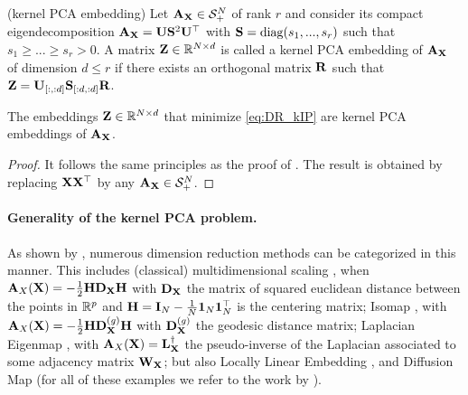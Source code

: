 \begin{definition}{(kernel PCA embedding)}
	Let ${\mathbf{A}}_{{\mathbf{X}}} \in \mathcal{S}^N_{+}$ of rank $r$ and consider its compact eigendecomposition ${\mathbf{A}}_{{\mathbf{X}}} = {\mathbf{U}} {\mathbf{S}}^2 {\mathbf{U}}^\top$ with ${\mathbf{S}} = \operatorname{diag}(s_1, ..., s_r)$ such that $s_1 \geq ... \geq s_r > 0$. A matrix
	${\mathbf{Z}} \in \mathbb{R}^{N \times d}$ is called a kernel PCA embedding of ${\mathbf{A}}_{{\mathbf{X}}}$ of dimension $d \leq r$ if there exists an orthogonal matrix ${\mathbf{R}}$ such that ${\mathbf{Z}} = {\mathbf{U}}_{[:,:d]} {\mathbf{S}}_{[:d,:d]} {\mathbf{R}}$.
\end{definition}

\begin{proposition}
	The embeddings ${\mathbf{Z}} \in \mathbb{R}^{N \times d}$ that minimize \ref{eq:DR_kIP} are kernel PCA embeddings of ${\mathbf{A}}_{{\mathbf{X}}}$.
\end{proposition}

\begin{proof}
	It follows the same principles as the proof of . The result is obtained by replacing ${\mathbf{X}} {\mathbf{X}}^\top$ by any ${\mathbf{A}}_{{\mathbf{X}}} \in \mathcal{S}^N_{+}$.
\end{proof}

\paragraph{Generality of the kernel PCA problem.}
As shown by \citet{ham2004kernel, ghojogh2021unified}, numerous dimension reduction methods can be categorized in this manner.
This includes 
(classical) multidimensional scaling \citep{borg2005modern}, when ${\mathbf{A}}_{X}({\mathbf{X}}) = -\frac{1}{2} {\mathbf{H}} {\mathbf{D}}_{\mathbf{X}} {\mathbf{H}}$ with ${\mathbf{D}}_{\mathbf{X}}$ the matrix of squared euclidean distance between the points in $\mathbb{R}^{p}$ and ${\mathbf{H}} = {\mathbf{I}}_N - \frac{1}{N} \bm{1}_N \bm{1}_N^\top$ is the centering matrix; Isomap \citep{tenenbaum2000global}, with ${\mathbf{A}}_{X}({\mathbf{X}}) = -\frac{1}{2} {\mathbf{H}} {\mathbf{D}}_{\mathbf{X}}^{(g)} {\mathbf{H}}$ with ${\mathbf{D}}_{\mathbf{X}}^{(g)}$ the geodesic distance matrix; Laplacian Eigenmap
\citep{belkin2003laplacian}, with ${\mathbf{A}}_{X}({\mathbf{X}}) = {\mathbf{L}}_{\mathbf{X}}^{\dagger}$ the pseudo-inverse of the Laplacian associated to some adjacency matrix ${\mathbf{W}}_{\mathbf{X}}$; but also Locally Linear Embedding \citep{roweis2000nonlinear}, and Diffusion Map \citep{coifman2006diffusion} (for all of these examples we refer to the work by \citealt[Table 1]{ghojogh2021unified}).

